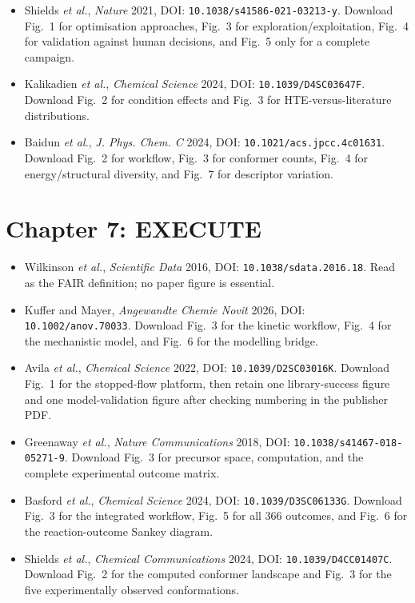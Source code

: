 \begin{itemize}
  \item Shields \textit{et al.}, \textit{Nature} 2021, DOI: \texttt{10.1038/s41586-021-03213-y}.
  Download Fig.~1 for optimisation approaches, Fig.~3 for exploration/exploitation, Fig.~4 for validation against human decisions, and Fig.~5 only for a complete campaign.
  \item Kalikadien \textit{et al.}, \textit{Chemical Science} 2024, DOI: \texttt{10.1039/D4SC03647F}.
  Download Fig.~2 for condition effects and Fig.~3 for HTE-versus-literature distributions.
  \item Baidun \textit{et al.}, \textit{J. Phys. Chem. C} 2024, DOI: \texttt{10.1021/acs.jpcc.4c01631}.
  Download Fig.~2 for workflow, Fig.~3 for conformer counts, Fig.~4 for energy/structural diversity, and Fig.~7 for descriptor variation.
\end{itemize}

\section*{Chapter 7: EXECUTE}

\begin{itemize}
  \item Wilkinson \textit{et al.}, \textit{Scientific Data} 2016, DOI: \texttt{10.1038/sdata.2016.18}.
  Read as the FAIR definition; no paper figure is essential.
  \item Kuffer and Mayer, \textit{Angewandte Chemie Novit} 2026, DOI: \texttt{10.1002/anov.70033}.
  Download Fig.~3 for the kinetic workflow, Fig.~4 for the mechanistic model, and Fig.~6 for the modelling bridge.
  \item Avila \textit{et al.}, \textit{Chemical Science} 2022, DOI: \texttt{10.1039/D2SC03016K}.
  Download Fig.~1 for the stopped-flow platform, then retain one library-success figure and one model-validation figure after checking numbering in the publisher PDF.
  \item Greenaway \textit{et al.}, \textit{Nature Communications} 2018, DOI: \texttt{10.1038/s41467-018-05271-9}.
  Download Fig.~3 for precursor space, computation, and the complete experimental outcome matrix.
  \item Basford \textit{et al.}, \textit{Chemical Science} 2024, DOI: \texttt{10.1039/D3SC06133G}.
  Download Fig.~3 for the integrated workflow, Fig.~5 for all 366 outcomes, and Fig.~6 for the reaction-outcome Sankey diagram.
  \item Shields \textit{et al.}, \textit{Chemical Communications} 2024, DOI: \texttt{10.1039/D4CC01407C}.
  Download Fig.~2 for the computed conformer landscape and Fig.~3 for the five experimentally observed conformations.
\end{itemize}

